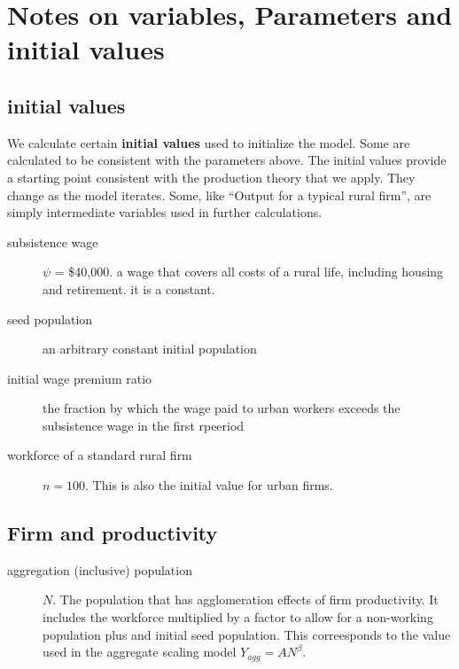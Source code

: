  \section{Notes on variables, Parameters and initial values} \label{section-notes-on-variables}
 
\subsection{initial values}
We calculate certain  \textbf{initial values} used to initialize the model. Some are calculated to be consistent with the parameters above. The initial values provide a starting point consistent with the production theory that we apply. They change as the model iterates.  Some, like ``Output for a typical rural firm'', are simply intermediate variables used in further calculations.%

\begin{description}

\item[subsistence wage] $\psi$ = \$40,000. %
a wage that covers all costs of a rural life, including housing and retirement. it is a constant.

\item[seed population] an arbitrary constant initial population 

\item[initial wage premium ratio] the fraction by which the wage paid to urban workers exceeds  the subsistence wage in the first rpeeriod 

\item[workforce of a standard rural firm] $n=100$. This is also the initial value for urban firms.
\end{description}


\subsection{Firm and productivity}

\begin{description}
\item[aggregation (inclusive) population  ]  $N$. The population that has agglomeration effects of firm productivity. It includes the workforce multiplied by a factor to allow for a non-working population plus and initial seed population. This correesponds to the value used in the aggregate scaling model $Y_{agg}= AN^\beta. $
\end{description}

